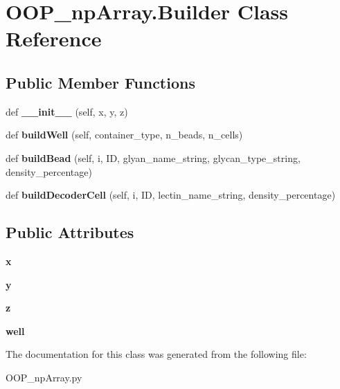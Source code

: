 \hypertarget{class_o_o_p__np_array_1_1_builder}{}\section{O\+O\+P\+\_\+np\+Array.\+Builder Class Reference}
\label{class_o_o_p__np_array_1_1_builder}
\subsection*{Public Member Functions}
\begin{DoxyCompactItemize}
\item 
\mbox{\label{class_o_o_p__np_array_1_1_builder_a50cbc2b655fea7a4d19ffc052186d235}} 
def {\bfseries \+\_\+\+\_\+init\+\_\+\+\_\+} (self, x, y, z)
\item 
\mbox{\label{class_o_o_p__np_array_1_1_builder_a3a5e9094d0a146909bee2801e6eaa2a6}} 
def {\bfseries build\+Well} (self, container\+\_\+type, n\+\_\+beads, n\+\_\+cells)
\item 
\mbox{\label{class_o_o_p__np_array_1_1_builder_a16432a43a2c78f298da41e298034092c}} 
def {\bfseries build\+Bead} (self, i, ID, glyan\+\_\+name\+\_\+string, glycan\+\_\+type\+\_\+string, density\+\_\+percentage)
\item 
\mbox{\label{class_o_o_p__np_array_1_1_builder_afeac17522351734ba9f2179bf2ce2ba0}} 
def {\bfseries build\+Decoder\+Cell} (self, i, ID, lectin\+\_\+name\+\_\+string, density\+\_\+percentage)
\end{DoxyCompactItemize}
\subsection*{Public Attributes}
\begin{DoxyCompactItemize}
\item 
\mbox{\label{class_o_o_p__np_array_1_1_builder_a8c467d9bb8090d442d5958ee7608ccd0}} 
{\bfseries x}
\item 
\mbox{\label{class_o_o_p__np_array_1_1_builder_a239eaa375c08c914044923b4d61f0654}} 
{\bfseries y}
\item 
\mbox{\label{class_o_o_p__np_array_1_1_builder_a840313467def308e058eca34ce812580}} 
{\bfseries z}
\item 
\mbox{\label{class_o_o_p__np_array_1_1_builder_ac1ae5e78e64e3ffbd3b948172ba552d0}} 
{\bfseries well}
\end{DoxyCompactItemize}


The documentation for this class was generated from the following file\+:\begin{DoxyCompactItemize}
\item 
O\+O\+P\+\_\+np\+Array.\+py\end{DoxyCompactItemize}
